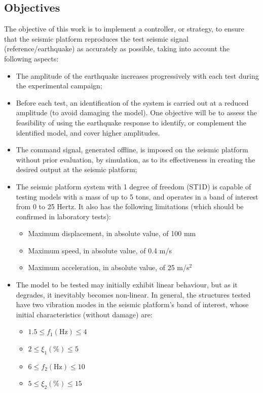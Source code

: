 \documentclass[10pt]{extarticle}
\begin{document}
\clearpage


\subsection{Objectives}
The objective of this work is to implement a controller, or strategy, to ensure that the seismic platform reproduces the test seismic signal (reference/earthquake) as accurately as possible, taking into account the following aspects:
\begin{itemize}
    \item The amplitude of the earthquake increases progressively with each test during the experimental campaign;
    \item Before each test, an identification of the system is carried out at a reduced amplitude (to avoid damaging the model). One objective will be to assess the feasibility of using the earthquake response to identify, or complement the identified model, and cover higher amplitudes.
    \item The command signal, generated offline, is imposed on the seismic platform without prior evaluation, by simulation, as to its effectiveness in creating the desired output at the seismic platform;
    \item The seismic platform system with 1 degree of freedom (ST1D) is capable of testing models with a mass of up to 5 tons, and operates in a band of interest from 0 to 25 Hertz. It also has the following limitations (which should be confirmed in laboratory tests):
    \begin{itemize}
        \item Maximum displacement, in absolute value, of 100 mm
        \item Maximum speed, in absolute value, of 0.4 m/s
        \item Maximum acceleration, in absolute value, of 25 m/s$^2$
    \end{itemize}
    \item The model to be tested may initially exhibit linear behaviour, but as it degrades, it inevitably becomes non-linear. In general, the structures tested have two vibration modes in the seismic platform's band of interest, whose initial characteristics (without damage) are:
    \begin{itemize}[label=$\diamond$]
    \item $1.5 \leq f_1 (\mathrm{Hz}) \leq 4$
    \item $2 \leq \xi_1 (\%) \leq 5$
    \item $6 \leq f_2 (\mathrm{Hz}) \leq 10$
    \item $5 \leq \xi_2 (\%) \leq 15$
    

\end{itemize}
\end{itemize}
\end{document}

